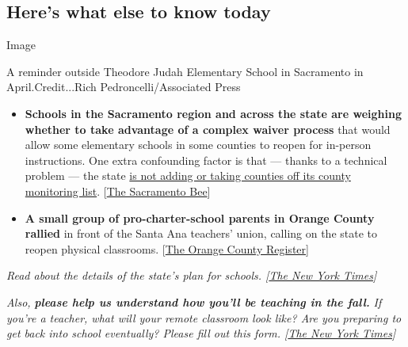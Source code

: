 \hypertarget{heres-what-else-to-know-today}{%
\subsection{Here's what else to know
today}\label{heres-what-else-to-know-today}}

Image

A reminder outside Theodore Judah Elementary School in Sacramento in
April.Credit...Rich Pedroncelli/Associated Press

\begin{itemize}
\tightlist
\item
  \textbf{Schools in the Sacramento region and across the state are
  weighing whether to take advantage of a complex waiver process} that
  would allow some elementary schools in some counties to reopen for
  in-person instructions. One extra confounding factor is that ---
  thanks to a technical problem --- the state
  \href{https://ktla.com/news/california/no-counties-will-be-removed-added-from-covid-19-watchlist-amid-californias-data-issues/}{is
  not adding or taking counties off its county monitoring list}.
  {[}\href{https://www.sacbee.com/news/coronavirus/article244717802.html}{The
  Sacramento Bee}{]}
\end{itemize}

\begin{itemize}
\tightlist
\item
  \textbf{A small group of pro-charter-school parents in Orange County
  rallied} in front of the Santa Ana teachers' union, calling on the
  state to reopen physical classrooms.
  {[}\href{https://www.ocregister.com/2020/08/04/these-o-c-parents-have-a-message-for-gov-newsom-teachers-unions-open-up-the-schools/}{The
  Orange County Register}{]}
\end{itemize}

\emph{Read about the details of the state's plan for schools.
{[}}\href{https://www.nytimes3xbfgragh.onion/2020/07/17/us/california-schools-reopening-newsom.html}{\emph{The
New York Times}}\emph{{]}}

\emph{Also,} \emph{\textbf{please help us understand how you'll be
teaching in the fall.}} \emph{If you're a teacher, what will your remote
classroom look like? Are you preparing to get back into school
eventually? Please fill out this form.
{[}}\href{https://www.nytimes3xbfgragh.onion/2020/08/05/reader-center/teachers-show-us-how-the-coronavirus-is-changing-your-classroom.html?referringSource=articleShare}{\emph{The
New York Times}}\emph{{]}}

